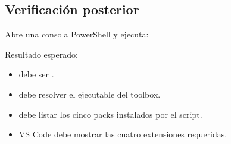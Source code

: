 \documentclass[letterpaper,10pt,english]{sphinxmanual}
\begin{document}
\subsection{Verificación posterior}
\label{\detokenize{vscode:id5}}
\sphinxAtStartPar
Abre una  consola PowerShell y ejecuta:

\begin{sphinxVerbatim}[commandchars=\\\{\}]
 
 
 
    
\end{sphinxVerbatim}

\sphinxAtStartPar
Resultado esperado:
\begin{itemize}
\item {} 
\sphinxAtStartPar
{} debe ser .

\item {} 
\sphinxAtStartPar
{} debe resolver el ejecutable del toolbox.

\item {} 
\sphinxAtStartPar
{} debe listar los cinco packs instalados por el script.

\item {} 
\sphinxAtStartPar
VS Code debe mostrar las cuatro extensiones requeridas.

\end{itemize}
\end{document}
